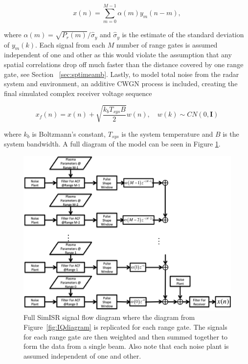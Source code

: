 \begin{equation}
\label{eq4}
x(n) = \displaystyle\sum\limits_{m =0}^{M-1} \alpha(m)y_m(n-m),
\end{equation}

\noindent where $\alpha(m) = \sqrt{P_r(m)}/\widehat{\sigma}_y$ and $\widehat{\sigma}_y$ is the estimate of the standard deviation of $y_m(k)$. Each signal from each $M$ number of range gates is assumed independent of one and other as this would violate the assumption that any spatial correlations drop off much faster than the distance covered by one range gate, see Section ~\ref{sec:sptimeamb}. Lastly, to model total noise from the radar system and environment, an additive CWGN process is included, creating the final simulated complex receiver voltage sequence

\begin{equation}
\label{eq:addnoise}
x_f(n) = x(n) +\sqrt{\frac{k_bT_{sys}B}{2}} w(n), \quad w(k)\sim CN(0,\mathbf{I})
\end{equation}

\noindent where $k_b$ is Boltzmann's constant, $T_{sys}$ is the system temperature and $B$ is the system bandwidth.
A full diagram of the model can be seen in Figure \ref{fig:isrdiag}.

\begin{figure}[!h]
\centering
\includegraphics[width=5.5in]{diagram}
\caption{Full SimISR signal flow diagram where the diagram from Figure~\ref{fig:IQdiagram} is replicated for each range gate. The signals for each range gate are then weighted and then summed together to form the data from a single beam. Also note that each noise plant is assumed independent of one and other.}
\label{fig:isrdiag}
\end{figure}

